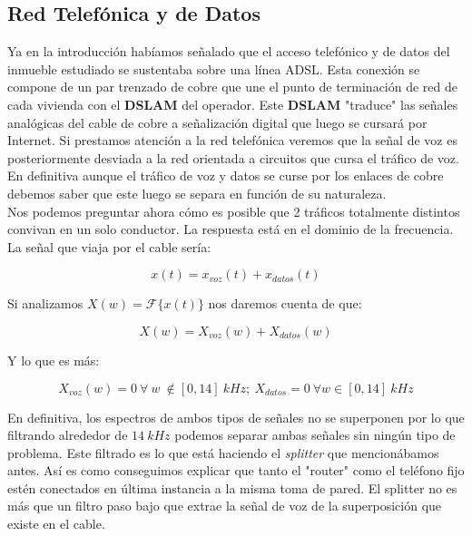 \documentclass{article}[12 pt]
\begin{document}
		\subsection{Red Telefónica y de Datos}
			Ya en la introducción habíamos señalado que el acceso telefónico y de datos del inmueble estudiado se sustentaba sobre una línea ADSL. Esta conexión se compone de un par trenzado de cobre que une el punto de terminación de red de cada vivienda con el \textbf{DSLAM} del operador. Este \textbf{DSLAM} "traduce" las señales analógicas del cable de cobre a señalización digital que luego se cursará por Internet. Si prestamos atención a la red telefónica veremos que la señal de voz es posteriormente desviada a la red orientada a circuitos que cursa el tráfico de voz. En definitiva aunque el tráfico de voz y datos se curse por los enlaces de cobre debemos saber que este luego se separa en función de su naturaleza.\\

			Nos podemos preguntar ahora cómo es posible que 2 tráficos totalmente distintos convivan en un solo conductor. La respuesta está en el dominio de la frecuencia. La señal que viaja por el cable sería:

			$$x(t) = x_{voz}(t) + x_{datos}(t)$$

			Si analizamos $X(w) = \mathcal{F}\{x(t)\}$ nos daremos cuenta de que:

			$$X(w) = X_{voz}(w) + X_{datos}(w)$$

			Y lo que es más:

			$$X_{voz}(w) = 0\ \forall \ w \ \notin [0, 14]\ kHz;\ X_{datos} = 0\ \forall w \in [0, 14]\ kHz$$

			En definitiva, los espectros de ambos tipos de señales no se superponen por lo que filtrando alrededor de $14\ kHz$ podemos separar ambas señales sin ningún tipo de problema. Este filtrado es lo que está haciendo el \textit{splitter} que mencionábamos antes. Así es como conseguimos explicar que tanto el "router" como el teléfono fijo estén conectados en última instancia a la misma toma de pared. El splitter no es más que un filtro paso bajo que extrae la señal de voz de la superposición que existe en el cable.\\
\end{document}

